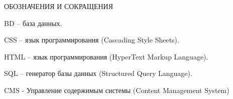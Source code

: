 \newpage
\begin{center}ОБОЗНАЧЕНИЯ И СОКРАЩЕНИЯ\end{center}


BD – база данных.

CSS – язык программирования (Cascading Style Sheets).

HTML – язык программирования (HyperText Markup Language). 

SQL – генератор базы данных (Structured Query Language).

CMS - Управление содержимым системы (Content Management System)